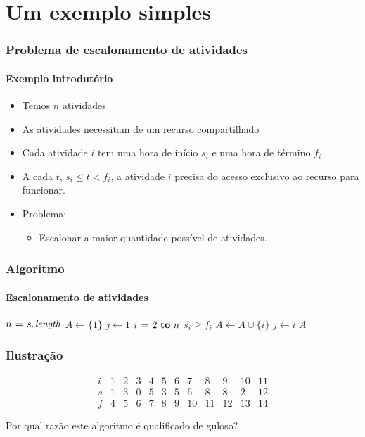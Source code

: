 \documentclass{beamer}
\begin{document}
\section{Um exemplo simples}


\begin{frame}
\frametitle{Problema de escalonamento de atividades}
\framesubtitle{Exemplo introdutório}

\begin{itemize}
\item Temos $n$ atividades
\item As atividades necessitam de um recurso compartilhado
\item Cada atividade $i$ tem uma hora de início $s_i$
e uma hora de término $f_i$
\item A cada $t$, $s_i \le t < f_i$, a atividade $i$ precisa
do acesso exclusivo ao recurso para funcionar.
\item Problema:
\begin{itemize}
\item Escalonar a maior quantidade possível de atividades.
\end{itemize}
\end{itemize}

\end{frame}


\begin{frame}
\frametitle{Algoritmo}
\framesubtitle{Escalonamento de atividades}

\begin{codebox}
\zi {}
\li $n \gets \attrib{s}{length}$
\zi {}
\li $A \gets \{ 1 \}$  
\zi {}
\li $j \gets 1$
\li \For $i \gets 2 \To n$ 
\li \Do \If $s_i \ge f_i$
\li   \Then $A \gets A \cup \{ i \}$
\li     $j \gets i$
      \End
    \End
\li \Return $A$
\end{codebox}

\end{frame}


\begin{frame}
\frametitle{Ilustração}

$$
\begin{array}{|c|c|c|c|c|c|c|c|c|c|c|c|}
i & 1 & 2 & 3 & 4 & 5 & 6 & 7 & 8 & 9 & 10 & 11 \\
\hline
\hline
s & 1 & 3 & 0 & 5 & 3 & 5 & 6 & 8 & 8 & 2 & 12 \\
\hline
f & 4 & 5 & 6 & 7 & 8 & 9 & 10 & 11 & 12 & 13 & 14
\end{array}
$$

\pause
Por qual razão este algoritmo é qualificado de \alert{guloso}?

\end{frame}
\end{document}
